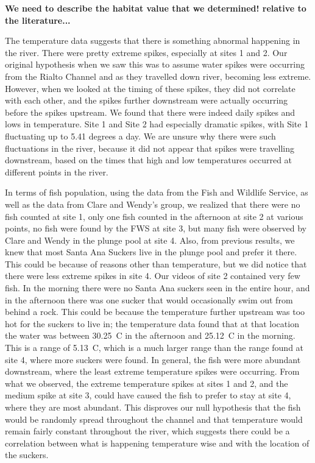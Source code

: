 \documentclass{article}\usepackage[]{graphicx}\usepackage[]{color}
\begin{document}
\textbf{We need to describe the habitat value that we determined! relative to the literature...}

The temperature data suggests that there is something abnormal happening in the river. There were pretty extreme spikes, especially at sites 1 and 2. Our original hypothesis when we saw this was to assume water spikes were occurring from the Rialto Channel and as they travelled down river, becoming less extreme. However, when we looked at the timing of these spikes, they did not correlate with each other, and the spikes further downstream were actually occurring before the spikes upstream. We found that there were indeed daily spikes and lows in temperature. Site 1 and Site 2 had especially dramatic spikes, with Site 1 fluctuating up to 5.41 degrees a day. We are unsure why there were such fluctuations in the river, because it did not appear that spikes were travelling downstream, based on the times that high and low temperatures occurred at different points in the river. 

In terms of fish population, using the data from the Fish and Wildlife Service, as well as the data from Clare and Wendy's group, we realized that there were no fish counted at site 1, only one fish counted in the afternoon at site 2 at various points, no fish were found by the FWS at site 3, but many fish were observed by Clare and Wendy in the plunge pool at site 4. Also, from previous results, we knew that most Santa Ana Suckers live in the plunge pool and prefer it there. This could be because of reasons other than temperature, but we did notice that there were less extreme spikes in site 4. Our videos of site 2 contained very few fish. In the morning there were no Santa Ana suckers seen in the entire hour, and in the afternoon there was one sucker that would occasionally swim out from behind a rock.  This could be because the temperature further upstream was too hot for the suckers to live in; the temperature data found that at that location the water was between 30.25\textdegree~C in the afternoon and 25.12\textdegree~C in the morning. This is a range of 5.13\textdegree~C, which is a much larger range than the range found at site 4, where more suckers were found. In general, the fish were more abundant downstream, where the least extreme temperature spikes were occurring. From what we observed, the extreme temperature spikes at sites 1 and 2, and the medium spike at site 3, could have caused the fish to prefer to stay at site 4, where they are most abundant. This disproves our null hypothesis that the fish would be randomly spread throughout the channel and that temperature would remain fairly constant throughout the river, which suggests there could be a correlation between what is happening temperature wise and with the location of the suckers.
\end{document}

